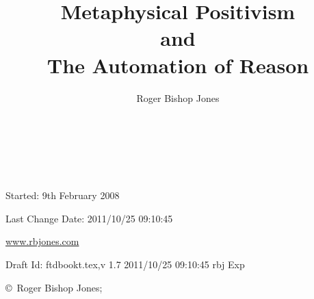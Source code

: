 \documentclass[10pt,titlepage]{article}
\author{Roger Bishop Jones}
\title{Metaphysical Positivism\\ and\\ The Automation of Reason}
\date{\ }
\begin{document}
\begin{titlepage}
\maketitle

\ 
\\

\vfill

\begin{centering}

{\footnotesize

Started: 9th February 2008

Last Change $ $Date: 2011/10/25 09:10:45 $ $

\href{http://www.rbjones.com/}{www.rbjones.com}

Draft $ $Id: ftdbookt.tex,v 1.7 2011/10/25 09:10:45 rbj Exp $ $

\copyright\ Roger Bishop Jones;

}%

\end{centering}

\thispagestyle{empty}
\end{titlepage}

{\parskip=0pt\tableofcontents}
\end{document}
